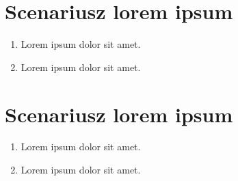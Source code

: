 \documentclass[11pt,a4paper]{article}
\begin{document}
\section{Scenariusz lorem ipsum}
\begin{enumerate}
\item{Lorem ipsum dolor sit amet.}
\item{Lorem ipsum dolor sit amet.}
\end{enumerate}

\section{Scenariusz lorem ipsum}
\begin{enumerate}
\item{Lorem ipsum dolor sit amet.}
\item{Lorem ipsum dolor sit amet.}
\end{enumerate}
\end{document}

